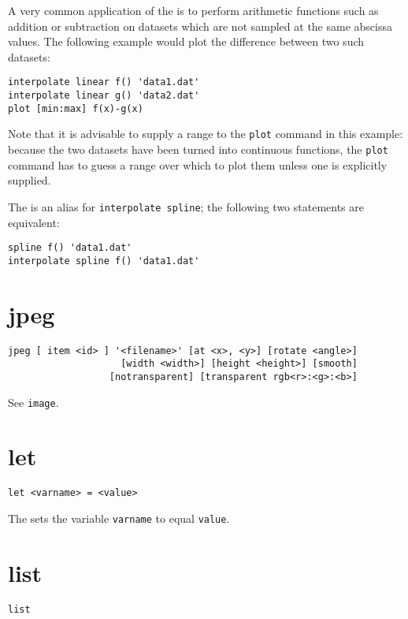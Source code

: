 A very common application of the  is to perform arithmetic
functions such as addition or subtraction on datasets which are not sampled at
the same abscissa values. The following example would plot the difference
between two such datasets:

\begin{verbatim}
interpolate linear f() 'data1.dat'
interpolate linear g() 'data2.dat'
plot [min:max] f(x)-g(x)
\end{verbatim}

\noindent Note that it is advisable to supply a range to the {\tt plot} command
in this example: because the two datasets have been turned into continuous
functions, the {\tt plot} command has to guess a range over which to plot them
unless one is explicitly supplied.

The  is an alias for {\tt interpolate spline}; the following
two statements are equivalent:

\begin{verbatim}
spline f() 'data1.dat'
interpolate spline f() 'data1.dat'
\end{verbatim}


\section{jpeg}

\begin{verbatim}
jpeg [ item <id> ] '<filename>' [at <x>, <y>] [rotate <angle>]
                    [width <width>] [height <height>] [smooth]
                  [notransparent] [transparent rgb<r>:<g>:<b>]
\end{verbatim}

See {\tt image}.


\section{let}

\begin{verbatim}
let <varname> = <value>
\end{verbatim}

The  sets the variable {\tt varname} to equal {\tt value}.


\section{list}

\begin{verbatim}
list
\end{verbatim}

